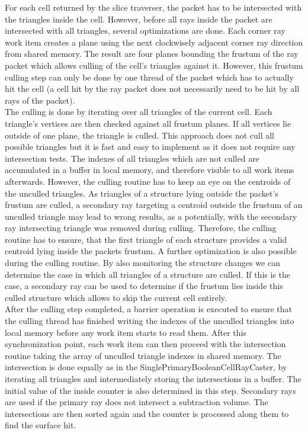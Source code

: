 For each cell returned by the slice traverser, the packet has to be intersected with the triangles inside the cell. However, before all rays inside the packet are intersected with all triangles, several optimizations are done. Each corner ray work item creates a plane using the next clockwisely adjacent corner ray direction from shared memory. The result are four planes bounding the frustum of the ray packet which allows culling of the cell's triangles against it. However, this frustum culling step can only be done by one thread of the packet which has to actually hit the cell (a cell hit by the ray packet does not necessarily need to be hit by all rays of the packet). \\
The culling is done by iterating over all triangles of the current cell. Each triangle's vertices are then checked against all frustum planes. If all vertices lie outside of one plane, the triangle is culled. This approach does not cull all possible triangles but it is fast and easy to implement as it does not require any intersection tests. The indexes of all triangles which are not culled are accumulated in a buffer in local memory, and therefore visible to all work items afterwards. However, the culling routine has to keep an eye on the centroids of the unculled triangles. As triangles of a structure lying outside the packet's frustum are culled, a secondary ray targeting a centroid outside the frustum of an unculled triangle may lead to wrong results, as a potentially, with the secondary ray intersecting triangle was removed during culling. Therefore, the culling routine has to ensure, that the first triangle of each structure provides a valid centroid lying inside the packets frustum.
A further optimization is also possible during the culling routine. By also monitoring the structure changes we can determine the case in which all triangles of a structure are culled. If this is the case, a secondary ray can be used to determine if the frustum lies inside this culled structure which allows to skip the current cell entirely. \\
After the culling step completed, a barrier operation is executed to ensure that the culling thread has finished writing the indexes of the unculled triangles into local memory before any work item starts to read them. After this synchronization point, each work item can then proceed with the intersection routine taking the array of unculled triangle indexes in shared memory. The intersection is done equally as in the SinglePrimaryBooleanCellRayCaster, by iterating all triangles and intermediately storing the intersections in a buffer. The initial value of the inside counter is also determined in this step. Secondary rays are used if the primary ray does not intersect a subtraction volume. The intersections are then sorted again and the counter is processed along them to find the surface hit.

